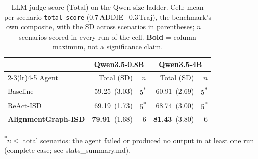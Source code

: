 
\begin{table}[t]
  \caption{LLM judge score (Total) on the Qwen size ladder. Cell: mean per-scenario \texttt{total\_score} ($0.7\,$ADDIE$+0.3\,$Traj), the benchmark's own composite, with the SD across scenarios in parentheses; $n$ = scenarios scored in every run of the cell. \textbf{Bold} = column maximum, not a significance claim.}
  \label{tab:rq1-ladder-total}
  \small
  \begin{tabular}{@{}lr@{\hskip 3pt}rr@{\hskip 3pt}r@{}}
    \toprule
    & \multicolumn{2}{c}{Qwen3.5-0.8B} & \multicolumn{2}{c}{Qwen3.5-4B} \\
    \cmidrule(lr){2-3}\cmidrule(lr){4-5}
    Agent & Total {\scriptsize(SD)} & $n$ & Total {\scriptsize(SD)} & $n$ \\
    \midrule
    Baseline & 59.25~{\scriptsize(3.03)} & 5\textsuperscript{*} & 60.91~{\scriptsize(2.69)} & 5\textsuperscript{*} \\
    ReAct-ISD & 69.19~{\scriptsize(1.73)} & 5\textsuperscript{*} & 68.74~{\scriptsize(3.00)} & 5\textsuperscript{*} \\
    \textbf{AlignmentGraph-ISD} & \textbf{79.91}~{\scriptsize(1.68)} & 6 & \textbf{81.43}~{\scriptsize(3.80)} & 6 \\
    \bottomrule
  \end{tabular}
  \par\smallskip\footnotesize\textsuperscript{*}$n<$ total scenarios: the agent failed or produced no output in at least one run (complete-case; see stats\_summary.md).
\end{table}
